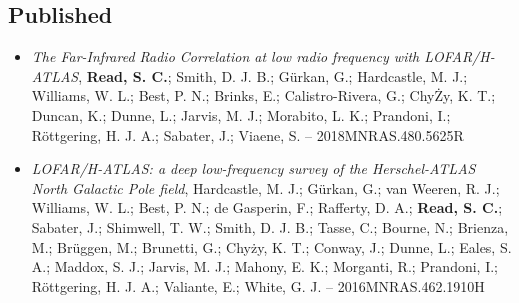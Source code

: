 \documentclass[letterpaper]{twentysecondcv} %
\begin{document}
\subsection{Published}
\begin{itemize}
     \item \textit{The Far-Infrared Radio Correlation at low radio frequency with
LOFAR/H-ATLAS}, \textbf{Read, S. C.}; Smith, D. J. B.; Gürkan, G.; Hardcastle, M. J.;
Williams, W. L.; Best, P. N.; Brinks, E.; Calistro-Rivera, G.; ChyŻy, K.
T.; Duncan, K.; Dunne, L.; Jarvis, M. J.; Morabito, L. K.; Prandoni, I.;
Röttgering, H. J. A.; Sabater, J.; Viaene, S. -- 2018MNRAS.480.5625R\\
 \item \textit{LOFAR/H-ATLAS: a deep low-frequency survey of the Herschel-ATLAS North
Galactic Pole field}, Hardcastle, M. J.; Gürkan, G.; van Weeren, R. J.; Williams, W. L.; Best,
P. N.; de Gasperin, F.; Rafferty, D. A.; \textbf{Read, S. C.}; Sabater,
J.; Shimwell, T. W.; Smith, D. J. B.; Tasse, C.; Bourne, N.; Brienza,
M.; Brüggen, M.; Brunetti, G.; Chyży, K. T.; Conway, J.; Dunne, L.;
Eales, S. A.; Maddox, S. J.; Jarvis, M. J.; Mahony, E. K.; Morganti, R.;
Prandoni, I.; Röttgering, H. J. A.; Valiante, E.; White, G. J. -- 2016MNRAS.462.1910H\\
\end{itemize}
\end{document}

